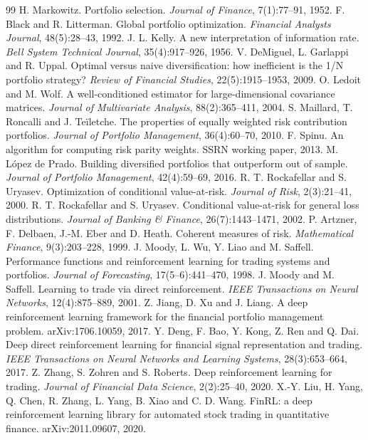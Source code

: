 \documentclass[11pt]{article}
\begin{document}
\clearpage
\begin{thebibliography}{99}
 H. Markowitz. Portfolio selection. \emph{Journal of Finance}, 7(1):77--91, 1952.
 F. Black and R. Litterman. Global portfolio optimization. \emph{Financial Analysts Journal}, 48(5):28--43, 1992.
 J. L. Kelly. A new interpretation of information rate. \emph{Bell System Technical Journal}, 35(4):917--926, 1956.
 V. DeMiguel, L. Garlappi and R. Uppal. Optimal versus naive diversification: how inefficient is the 1/N portfolio strategy? \emph{Review of Financial Studies}, 22(5):1915--1953, 2009.
 O. Ledoit and M. Wolf. A well-conditioned estimator for large-dimensional covariance matrices. \emph{Journal of Multivariate Analysis}, 88(2):365--411, 2004.
 S. Maillard, T. Roncalli and J. Teïletche. The properties of equally weighted risk contribution portfolios. \emph{Journal of Portfolio Management}, 36(4):60--70, 2010.
 F. Spinu. An algorithm for computing risk parity weights. SSRN working paper, 2013.
 M. López de Prado. Building diversified portfolios that outperform out of sample. \emph{Journal of Portfolio Management}, 42(4):59--69, 2016.
 R. T. Rockafellar and S. Uryasev. Optimization of conditional value-at-risk. \emph{Journal of Risk}, 2(3):21--41, 2000.
 R. T. Rockafellar and S. Uryasev. Conditional value-at-risk for general loss distributions. \emph{Journal of Banking \& Finance}, 26(7):1443--1471, 2002.
 P. Artzner, F. Delbaen, J.-M. Eber and D. Heath. Coherent measures of risk. \emph{Mathematical Finance}, 9(3):203--228, 1999.
 J. Moody, L. Wu, Y. Liao and M. Saffell. Performance functions and reinforcement learning for trading systems and portfolios. \emph{Journal of Forecasting}, 17(5--6):441--470, 1998.
 J. Moody and M. Saffell. Learning to trade via direct reinforcement. \emph{IEEE Transactions on Neural Networks}, 12(4):875--889, 2001.
 Z. Jiang, D. Xu and J. Liang. A deep reinforcement learning framework for the financial portfolio management problem. arXiv:1706.10059, 2017.
 Y. Deng, F. Bao, Y. Kong, Z. Ren and Q. Dai. Deep direct reinforcement learning for financial signal representation and trading. \emph{IEEE Transactions on Neural Networks and Learning Systems}, 28(3):653--664, 2017.
 Z. Zhang, S. Zohren and S. Roberts. Deep reinforcement learning for trading. \emph{Journal of Financial Data Science}, 2(2):25--40, 2020.
 X.-Y. Liu, H. Yang, Q. Chen, R. Zhang, L. Yang, B. Xiao and C. D. Wang. FinRL: a deep reinforcement learning library for automated stock trading in quantitative finance. arXiv:2011.09607, 2020.

\end{thebibliography}
\end{document}
